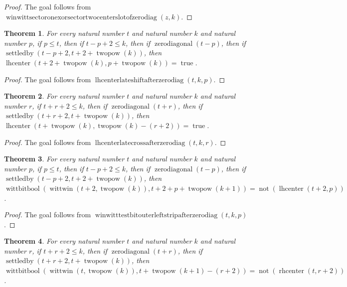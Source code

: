 \documentclass[11pt]{article}
\newtheorem{theorem}{Theorem}[section]
\theoremstyle{definition}
\begin{document}
\begin{proof}
The goal follows from \(\operatorname{winwittsectoronexorsectortwocenterslotofzerodiag}(z, k)\).
\end{proof}
\begin{theorem}
\label{ll:paper:lhcenter-late-shift-after-zero-diag}
For every natural number \(t\) and natural number \(k\) and natural number \(p\), if \(p \le t\), then if \(t - p + 2 \le k\), then if \(\operatorname{zerodiagonal}(t - p)\), then if \(\operatorname{settledby}(t - p + 2, t + 2 + \operatorname{twopow}(k))\), then \(\operatorname{lhcenter}(t + 2 + \operatorname{twopow}(k), p + \operatorname{twopow}(k)) = \operatorname{true}\).
\end{theorem}
\begin{proof}
The goal follows from \(\operatorname{lhcenterlateshiftafterzerodiag}(t, k, p)\).
\end{proof}
\begin{theorem}
\label{ll:paper:lhcenter-late-cross-after-zero-diag}
For every natural number \(t\) and natural number \(k\) and natural number \(r\), if \(t + r + 2 \le k\), then if \(\operatorname{zerodiagonal}(t + r)\), then if \(\operatorname{settledby}(t + r + 2, t + \operatorname{twopow}(k))\), then \(\operatorname{lhcenter}(t + \operatorname{twopow}(k), \operatorname{twopow}(k) - (r + 2)) = \operatorname{true}\).
\end{theorem}
\begin{proof}
The goal follows from \(\operatorname{lhcenterlatecrossafterzerodiag}(t, k, r)\).
\end{proof}
\begin{theorem}
\label{ll:paper:winwitt-testbit-outer-left-strip-after-zero-diag}
For every natural number \(t\) and natural number \(k\) and natural number \(p\), if \(p \le t\), then if \(t - p + 2 \le k\), then if \(\operatorname{zerodiagonal}(t - p)\), then if \(\operatorname{settledby}(t - p + 2, t + 2 + \operatorname{twopow}(k))\), then \(\operatorname{wittbitbool}(\operatorname{wittwin}(t + 2, \operatorname{twopow}(k)), t + 2 + p + \operatorname{twopow}(k + 1)) = \operatorname{not}(\operatorname{lhcenter}(t + 2, p))\).
\end{theorem}
\begin{proof}
The goal follows from \(\operatorname{winwitttestbitouterleftstripafterzerodiag}(t, k, p)\).
\end{proof}
\begin{theorem}
\label{ll:paper:winwitt-testbit-scale-cross-after-zero-diag}
For every natural number \(t\) and natural number \(k\) and natural number \(r\), if \(t + r + 2 \le k\), then if \(\operatorname{zerodiagonal}(t + r)\), then if \(\operatorname{settledby}(t + r + 2, t + \operatorname{twopow}(k))\), then \(\operatorname{wittbitbool}(\operatorname{wittwin}(t, \operatorname{twopow}(k)), t + \operatorname{twopow}(k + 1) - (r + 2)) = \operatorname{not}(\operatorname{rhcenter}(t, r + 2))\).
\end{theorem}
\end{document}
